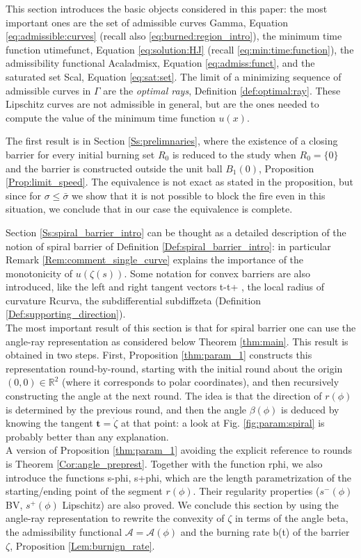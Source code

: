 \documentclass[reqno]{amsart}
\theoremstyle{definition} \newtheorem{definition}{Definition}[section]
\theoremstyle{definition} \newtheorem{remark}[definition]{Remark}
\theoremstyle{plain} \newtheorem{lemma}[definition]{Lemma}
\theoremstyle{plain} \newtheorem{proposition}[definition]{Proposition}
\theoremstyle{plain} \newtheorem{theorem}[definition]{Theorem}
\theoremstyle{plain} \newtheorem{corollary}[definition]{Corollary}
\theoremstyle{definition} \newtheorem{example}[definition]{Example}
\theoremstyle{plain} \newtheorem{claim}[clai]{Claim}
\theoremstyle{definition} \newtheorem{assumption}[definition]{Assumption}
\theoremstyle{definition} \newtheorem{observation}[definition]{Observation}
\newcommand{\R}{\mathbb{R}}
\newcommand{\1}{\mathbbm 1}
\numberwithin{equation}{section} %
\theoremstyle{plain} \newtheorem*{theorem*}{Theorem}
\theoremstyle{plain} \newtheorem{mthm}[maintheorem]{Main Theorem}
\theoremstyle{plain} \newtheorem*{mthm*}{Main Theorem}
\theoremstyle{plain} \newtheorem*{conjecture*}{Conjecture}
\theoremstyle{plain} \newtheorem{conjecture}[definition]{Conjecture}
\theoremstyle{plain} \newtheorem*{problem*}{Problem}
\begin{document}
This section introduces the basic objects considered in this paper: the most important ones are the set of admissible curves \gls{Gamma}, Equation \eqref{eq:admissible:curves} (recall also \eqref{eq:burned:region_intro}), the minimum time function \gls{utimefunct}, Equation \ref{eq:solution:HJ} (recall \eqref{eq:min:time:function}), the admissibility functional \gls{Acaladmisx}, Equation \ref{eq:admiss:funct}, and the saturated set \gls{Scal}, Equation \eqref{eq:sat:set}. The limit of a minimizing sequence of admissible curves in $\Gamma$ are the \emph{optimal rays}, Definition \ref{def:optimal:ray}. These Lipschitz curves are not admissible in general, but are the ones needed to compute the value of the minimum time function $u(x)$.

The first result is in Section \ref{Ss:prelimnaries}, where the existence of a closing barrier for every initial burning set $R_0$ is reduced to the study when $R_0 = \{0\}$ and the barrier is constructed outside the unit ball $B_1(0)$, Proposition \ref{Prop:limit_speed}. The equivalence is not exact as stated in the proposition, but since for $\sigma \leq \bar \sigma$ we show that it is not possible to block the fire even in this situation, we conclude that in our case the equivalence is complete.

Section \ref{Ss:spiral_barrier_intro} can be thought as a detailed description of the notion of spiral barrier of Definition \ref{Def:spiral_barrier_intro}: in particular Remark \ref{Rem:comment_single_curve} explains the importance of the monotonicity of $u(\zeta(s))$. Some notation for convex barriers are also introduced, like the left and right tangent vectors \gls{t-t+} , the local radius of curvature \gls{Rcurva}, the subdifferential \gls{subdiffzeta} (Definition \ref{Def:supporting_direction}). \\
The most important result of this section is that for spiral barrier one can use the angle-ray representation as considered below Theorem \ref{thm:main}. This result is obtained in two steps. First, Proposition \ref{thm:param_1} constructs this representation round-by-round, starting with the initial round about the origin $(0,0) \in \R^2$ (where it corresponds to polar coordinates), and then recursively constructing the angle at the next round. The idea is that the direction of $r(\phi)$ is determined by the previous round, and then the angle $\beta(\phi)$ is deduced by knowing the tangent $\mathbf t = \dot \zeta$ at that point: a look at Fig. \ref{fig:param:spiral} is probably better than any explanation. \\
A version of Proposition \ref{thm:param_1} avoiding the explicit reference to rounds is Theorem \ref{Cor:angle_preprest}. Together with the function \gls{rphi}, we also introduce the functions \gls{s-phi}, \gls{s+phi}, which are the length parametrization of the starting/ending point of the segment $r(\phi)$. Their regularity properties ($s^-(\phi)$ BV, $s^+(\phi)$ Lipschitz) are also proved. We conclude this section by using the angle-ray representation to rewrite the convexity of $\zeta$ in terms of the angle \gls{beta}, the admissibility functional $\mathcal A = \mathcal A(\phi)$ and the burning rate \gls{b(t)} of the barrier $\zeta$, Proposition \ref{Lem:burnign_rate}.
\end{document}
